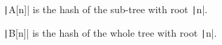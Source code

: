 \texttt|A[n]| is the hash of the sub-tree with root \texttt|n|.

\texttt|B[n]| is the hash of the whole tree with root \texttt|n|.

\inputminted{cpp}{src/graph/tree/tree-hash.cpp.com}
